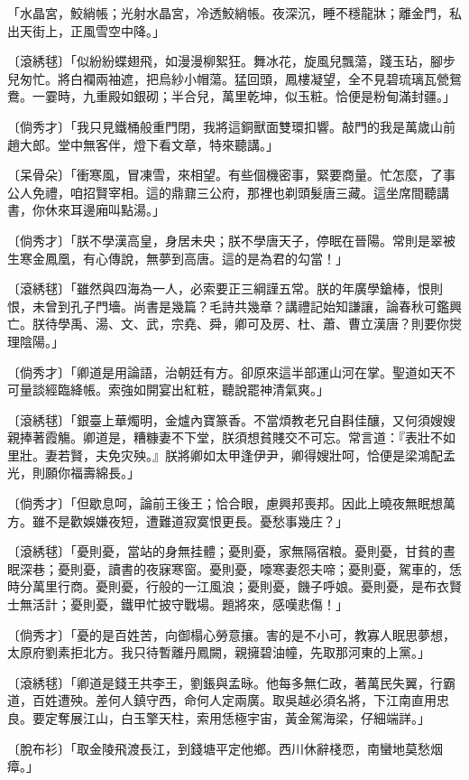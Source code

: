 \begin{showcontents}{}
「水晶宮，鮫綃帳；光射水晶宮，冷透鮫綃帳。夜深沉，睡不穩龍牀；離金門，私出天街上，正風雪空中降。」

〔滾綉毬〕「似紛紛蝶翅飛，如漫漫柳絮狂。舞冰花，旋風兒飄蕩，踐玉玷，腳步兒匆忙。將白襴兩袖遮，把烏紗小帽蕩。猛回頭，鳳樓凝望，全不見碧琉璃瓦甇鴛鴦。一霎時，九重殿如銀砌；半合兒，萬里乾坤，似玉粧。恰便是粉甸滿封疆。」

〔倘秀才〕「我只見鐵桶般重門閉，我將這銅獸面雙環扣響。敲門的我是萬歲山前趙大郎。堂中無客伴，燈下看文章，特來聽講。」

〔呆骨朵〕「衝寒風，冒凍雪，來相望。有些個機密事，緊要商量。忙怎麼，了事公人免禮，咱招賢宰相。這的鼎鼐三公府，那裡也剃頭髮唐三藏。這坐席間聽講書，你休來耳邊廂叫點湯。」

〔倘秀才〕「朕不學漢高皇，身居未央；朕不學唐天子，停眠在晉陽。常則是翠被生寒金鳳凰，有心傳說，無夢到高唐。這的是為君的勾當！」

〔滾綉毬〕「雖然與四海為一人，必索要正三綱謹五常。朕的年廣學鎗棒，恨則恨，未曾到孔子門墻。尚書是幾篇？毛詩共幾章？講禮記始知謙讓，論春秋可鑑興亡。朕待學禹、湯、文、武，宗堯、舜，卿可及房、杜、蕭、曹立漢唐？則要你爕理陰陽。」

〔倘秀才〕「卿道是用論語，治朝廷有方。卻原來這半部運山河在掌。聖道如天不可量談經臨絳帳。索強如開宴出紅粧，聽說罷神清氣爽。」

〔滾綉毬〕「銀臺上華燭明，金爐內寶篆香。不當煩教老兄自斟佳釀，又何須嫂嫂親捧著霞觴。卿道是，糟糠妻不下堂，朕須想貧賤交不可忘。常言道：『表壯不如里壯。妻若賢，夫免灾殃。』朕將卿如太甲逢伊尹，卿得嫂壯呵，恰便是梁鴻配孟光，則願你福壽綿長。」

〔倘秀才〕「但歇息呵，論前王後王；恰合眼，慮興邦喪邦。因此上曉夜無眠想萬方。雖不是歡娛嫌夜短，遭難道寂寞恨更長。憂愁事幾庄？」

〔滾綉毬〕「憂則憂，當站的身無挂體；憂則憂，家無隔宿粮。憂則憂，甘貧的晝眠深巷；憂則憂，讀書的夜寐寒窗。憂則憂，嚎寒妻怨夫啼；憂則憂，駕車的，恁時分萬里行商。憂則憂，行般的一江風浪；憂則憂，饑子呼娘。憂則憂，是布衣賢士無活計；憂則憂，鐵甲忙披守戰場。題將來，感嘆悲傷！」

〔倘秀才〕「憂的是百姓苦，向御榻心勞意攘。害的是不小可，教寡人眠思夢想，太原府劉素拒北方。我只待暫離丹鳳闕，親擁碧油幢，先取那河東的上黨。」

〔滾綉毬〕「卿道是錢王共李王，劉鋹與孟昹。他每多無仁政，著萬民失翼，行霸道，百姓遭殃。差何人鎮守西，命何人定兩廣。取吳越必須名將，下江南直用忠良。要定奪展江山，白玉擎天柱，索用恁極宇宙，黃金駕海梁，仔細端詳。」

〔脫布衫〕「取金陵飛渡長江，到錢塘平定他鄉。西川休辭棧恧，南蠻地莫愁烟瘴。」


\end{showcontents}
